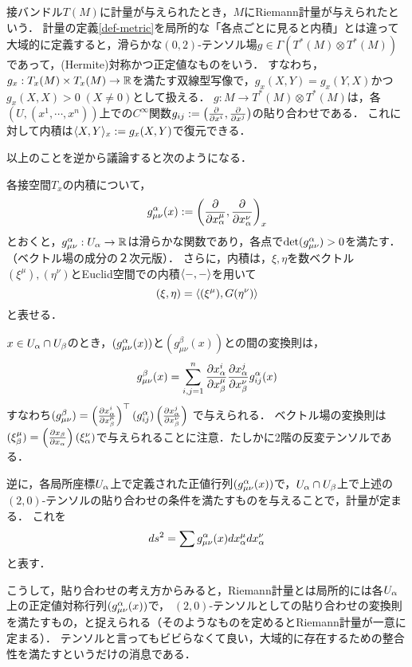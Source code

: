 \documentclass[uplatex,dvipdfmx]{jsreport}
\begin{document}
\begin{remarks}
    接バンドル$T(M)$に計量が与えられたとき，$M$にRiemann計量が与えられたという．
    計量の定義\ref{def-metric}を局所的な「各点ごとに見ると内積」とは違って大域的に定義すると，滑らかな$(0,2)$-テンソル場$g\in\Gamma(T^*(M)\otimes T^*(M))$であって，(Hermite)対称かつ正定値なものをいう．
    すなわち，$g_x:T_x(M)\times T_x(M)\to\mathbb{R}$を満たす双線型写像で，$g_x(X,Y)=g_x(Y,X)$かつ$g_x(X,X)>0\;(X\ne 0)$として扱える．
    $g:M\to T^*(M)\otimes T^*(M)$は，各$(U,(x^1,\cdots,x^n))$上での$C^\infty$関数$g_{ij}:=\left(\frac{\partial }{\partial x^i},\frac{\partial }{\partial x^j}\right)$の貼り合わせである．
    これに対して内積は$\langle X,Y\rangle_x:=g_x(X,Y)$で復元できる．
\end{remarks}

以上のことを逆から議論すると次のようになる．

\begin{notation}
    各接空間$T_x$の内積について，
    \[g_{\mu\nu}^\alpha(x):=\left(\frac{\partial }{\partial x_\alpha^\mu},\frac{\partial }{\partial x^\nu_\alpha}\right)_x\]
    とおくと，$g_{\mu\nu}^\alpha:U_\alpha\to\mathbb{R}$は滑らかな関数であり，各点で$\det(g^\alpha_{\mu\nu})>0$を満たす．
    （ベクトル場の成分の２次元版）．
    さらに，内積は，$\xi,\eta$を数ベクトル$(\xi^\mu),(\eta^\nu)$とEuclid空間での内積$\langle-,-\rangle$を用いて
    \[(\xi,\eta)=\langle(\xi^\mu),G(\eta^\nu)\rangle\]
    と表せる．

    $x\in U_\alpha\cap U_\beta$のとき，$(g_{\mu\nu}^\alpha(x))$と$(g_{\mu\nu}^\beta(x))$との間の変換則は，
    \[g_{\mu\nu}^\beta(x)=\sum^n_{i,j=1}\frac{\partial x_\alpha^i}{\partial x_\beta^\mu}\frac{\partial x_\alpha^j}{\partial x^\nu_\beta}g_{ij}^\alpha(x)\]
    すなわち$(g^\beta_{\mu\nu})=\left(\frac{\partial x^i_\alpha}{\partial x^\mu_\beta}\right)^\top(g_{ij}^\alpha)\left(\frac{\partial x^j_\alpha}{\partial x_\beta^\nu}\right)$
    で与えられる．
    ベクトル場の変換則は$(\xi_\beta^\mu)=\left(\frac{\partial x_\beta}{\partial x_\alpha}\right)(\xi_\alpha^\nu)$で与えられることに注意．たしかに2階の反変テンソルである．

    逆に，各局所座標$U_\alpha$上で定義された正値行列$(g_{\mu\nu}^\alpha(x))$で，$U_\alpha\cap U_\beta$上で上述の$(2,0)$-テンソルの貼り合わせの条件を満たすものを与えることで，計量が定まる．
    これを
    \[ds^2=\sum g_{\mu\nu}^\alpha(x)dx^\mu_\alpha dx_\alpha^\nu\]
    と表す．
\end{notation}
\begin{remarks}
    こうして，貼り合わせの考え方からみると，Riemann計量とは局所的には各$U_\alpha$上の正定値対称行列$(g_{\mu\nu}^\alpha(x))$で，
    $(2,0)$-テンソルとしての貼り合わせの変換則を満たすもの，と捉えられる（そのようなものを定めるとRiemann計量が一意に定まる）．
    テンソルと言ってもビビらなくて良い，大域的に存在するための整合性を満たすというだけの消息である．
\end{remarks}
\end{document}

